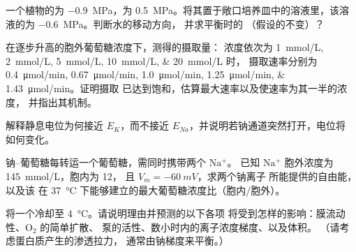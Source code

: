 \begin{exercise}[$\star\star$]\label{exo:b1:membranes-transport:6}
一个植物的为 \qty{-0.9}{MPa}，为
\qty{0.5}{MPa}。将其置于敞口培养皿中的溶液里，该溶液的为
\qty{-0.6}{MPa}。判断水的移动方向，
并求平衡时的
（假设的不变）？
\end{exercise}

\begin{exercise}[$\star\star$]\label{exo:b1:membranes-transport:7}
在逐步升高的胞外葡萄糖浓度下，测得的摄取量：
浓度依次为 \qtylist{1;2;5;10;20}{mmol/L} 时，
摄取速率分别为 \qtylist{0.4;0.67;1.0;1.25;1.43}{\micro mol/min}。证明摄取
已达到饱和，估算最大速率以及使速率为其一半的浓度，
并指出其机制。
\end{exercise}

\begin{exercise}[$\star\star$]\label{exo:b1:membranes-transport:8}
解释静息电位为何接近 $E_K$，而不接近
$E_{Na}$，并说明若钠通道突然打开，电位将
如何变化。
\end{exercise}

\begin{exercise}[$\star\star$]\label{exo:b1:membranes-transport:9}
钠–葡萄糖每转运一个葡萄糖，需同时携带两个 $\mathrm{Na^+}$。
已知 $\mathrm{Na^+}$ 胞外浓度为 \qty{145}{mmol/L}，胞内为 \qty{12}{}，
且 $V_m = \qty{-60}{mV}$，求两个钠离子
所能提供的自由能，以及该
在 \qty{37}{\celsius} 下能够建立的最大葡萄糖浓度比（胞内/胞外）。
\end{exercise}

\begin{exercise}[$\star\star\star$]\label{exo:b1:membranes-transport:10}
将一个冷却至 \qty{4}{\celsius}。请说明理由并预测的以下各项
将受到怎样的影响：膜流动性、$\mathrm{O_2}$ 的简单扩散、
泵的活性、数小时内的离子浓度梯度、以及体积。
（请考虑蛋白质产生的渗透拉力，
通常由钠梯度来平衡。）
\end{exercise}

